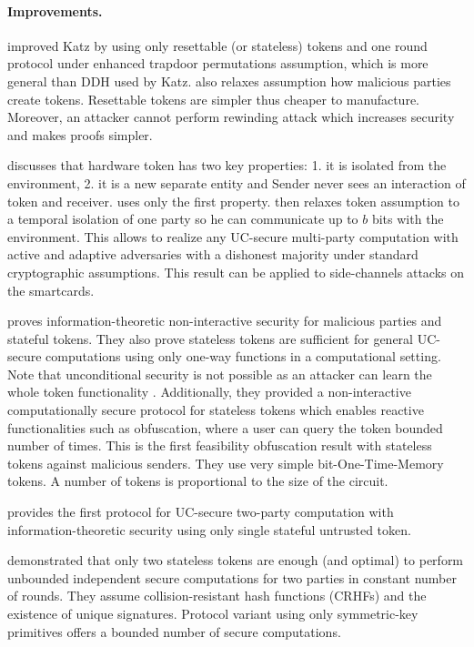 \documentclass[
  digital, %
  twoside, %
  table,   %
  lof,     %
  lot,     %
]{fithesis3}
\newcommand{\cmmnt}[1]{\ignorespaces}
\newcounter{ph4_show_guides}
\theoremstyle{definition}
\theoremstyle{remark}
\begin{document}
\paragraph{Improvements.}%
\cite{CGS08} improved Katz by using only resettable (or stateless) tokens and one round protocol under enhanced trapdoor permutations assumption, which is more general than DDH used by Katz. \cite{CGS08} also relaxes assumption how malicious parties create tokens\cmmnt{Attacker does not need to know the code}. Resettable tokens are simpler thus cheaper to manufacture. Moreover, an attacker cannot perform rewinding attack which increases security and makes proofs simpler.

\cite{DNW09} discusses that hardware token has two key properties: 1. it is isolated from the environment, 2. it is a new separate entity and Sender never sees an interaction of token and receiver. \cite{K07} uses only the first property. \cite{DNW09} then relaxes token assumption to a temporal isolation of one party so he can communicate up to $b$ bits with the environment. This allows to realize any UC-secure multi-party computation with active and adaptive adversaries with a dishonest majority under standard cryptographic assumptions. This result can be applied to side-channels attacks on the smartcards.

\cite{GISVW10} proves information-theoretic non-interactive security for malicious parties and stateful tokens. They also prove stateless tokens are sufficient for general UC-secure computations using only one-way functions in a computational setting. Note that unconditional security is not possible as an attacker can learn the whole token functionality \cite{GIMS10}. Additionally, they provided a non-interactive computationally secure protocol for stateless tokens which enables reactive functionalities such as obfuscation, where a user can query the token bounded number of times. This is the first feasibility obfuscation result with stateless tokens against malicious senders. They use very simple bit-One-Time-Memory tokens. A number of tokens is proportional to the size of the circuit.

\cite{DKM11} provides the first protocol for UC-secure two-party computation with information-theoretic security using only single stateful untrusted token.

\cite{CKSYZ14} demonstrated that only two stateless tokens are enough (and optimal) to perform unbounded independent secure computations for two parties in constant number of rounds.
They assume collision-resistant hash functions (CRHFs) and the existence of unique signatures. Protocol variant using only symmetric-key primitives offers a bounded number of secure computations.
\end{document}
